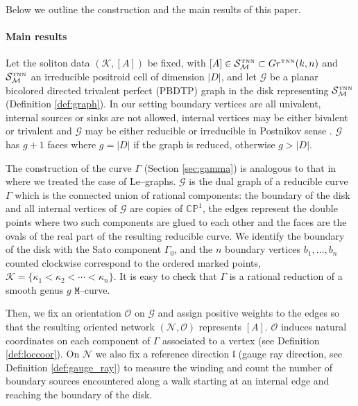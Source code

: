 \documentclass[11pt]{amsart}
\theoremstyle{plain}
\numberwithin{equation}{section}
\def \S {{\mathcal S}_{\mathcal M}^{\mbox{\tiny TNN}}}
\begin{document}
Below we outline the construction and the main results of this paper.

\smallskip

\paragraph{\textbf{Main results}}
Let the soliton data $(\mathcal K, [A])$ be fixed, with $[A]\in \S \subset Gr^{\mbox{\tiny TNN}}(k,n)$ and $\S$ an irreducible positroid cell of dimension $|D|$, and let $\mathcal G$ be a planar bicolored directed trivalent perfect (PBDTP) graph in the disk representing $\S$ (Definition \ref{def:graph}). In our setting boundary vertices are all univalent, internal sources or sinks are not allowed, internal vertices may be either bivalent or trivalent and $\mathcal G$ may be either reducible or irreducible in Postnikov sense \cite{Pos}. $\mathcal G$ has $g+1$ faces where $g=|D|$ if the graph is reduced, otherwise $g>|D|$.

The construction of the curve $\Gamma$ (Section \ref{sec:gamma}) is analogous to that in \cite{AG3} where we treated the case of Le--graphs. $\mathcal G$ is the dual graph of a reducible curve $\Gamma$ which is the connected union of rational components: the boundary of the disk and all internal vertices of $\mathcal G$ are copies of $\mathbb{CP}^1$, the edges represent the double points where two such components are glued to each other and the faces are the ovals of the real part of the resulting reducible curve. 
We identify the boundary of the disk with the Sato component $\Gamma_0$, and the $n$ boundary vertices $b_1,\dots, b_n$ counted clockwise correspond to the ordered marked points, $\mathcal K = \{ \kappa_1 < \kappa_2 < \cdots < \kappa_n \}$. It is easy to check that  $\Gamma$ is a rational reduction of a smooth genus $g$ $\mathtt M$--curve.
 
Then, we fix an orientation $\mathcal O$ on $\mathcal G$ and assign positive weights to the edges so that the resulting oriented network $(\mathcal N, \mathcal O)$ represents $[A]$. $\mathcal O$ induces natural coordinates on each component of $\Gamma$ associated to a vertex (see Definition \ref{def:loccoor}). On $\mathcal N$ we also fix a reference direction $\mathfrak l$ (gauge ray direction, see Definition \ref{def:gauge_ray}) to measure the winding and count the number of boundary sources encountered along a walk starting at an internal edge and reaching the boundary of the disk. 
\end{document}
